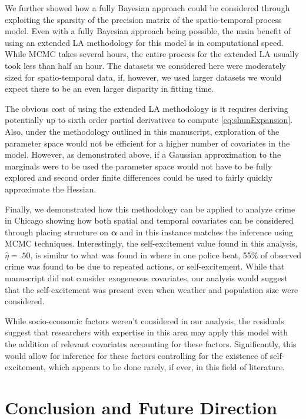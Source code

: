 \documentclass[11pt]{isuthesis}
\begin{document}
	We further showed how a fully Bayesian approach could be considered through exploiting the sparsity of the precision matrix of the spatio-temporal process model.  Even with a fully Bayesian approach being possible, the main benefit of using an extended LA methodology for this model is in computational speed.  While MCMC takes several hours, the entire process for the extended LA usually took less than half an hour.  The datasets we considered here were moderately sized for spatio-temporal data, if, however, we used larger datasets we would expect there to be an even larger disparity in fitting time.
	
	The obvious cost of using the extended LA methodology is it requires deriving potentially up to sixth order partial derivatives to compute \eqref{eq:shunExpansion}.  Also, under the methodology outlined in this manuscript, exploration of the parameter space would not be efficient for a higher number of covariates in the model.  However, as demonstrated above, if a Gaussian approximation to the marginals were to be used the parameter space would not have to be fully explored and second order finite differences could be used to fairly quickly approximate the Hessian.
	
	Finally, we demonstrated how this methodology can be applied to analyze crime in Chicago showing how both spatial and temporal covariates can be considered through placing structure on $\boldsymbol{\alpha}$ and in this instance matches the inference using MCMC techniques.  Interestingly, the self-excitement value found in this analysis, $\hat{\eta}=.50$, is similar to what was found in \cite{mohler2013modeling} where in one police beat, 55\% of observed crime was found to be due to repeated actions, or self-excitement.  While that manuscript did not consider exogeneous covariates, our analysis would suggest that the self-excitement was present even when weather and population size were considered.  
	
	While socio-economic factors weren't considered in our analysis, the residuals suggest that researchers with expertise in this area may apply this model with the addition of relevant covariates accounting for these factors.  Significantly, this would allow for inference for these factors controlling for the existence of self-excitement, which appears to be done rarely, if ever, in this field of literature. 
	
	\chapter{Conclusion and Future Direction}
	
\end{document}
